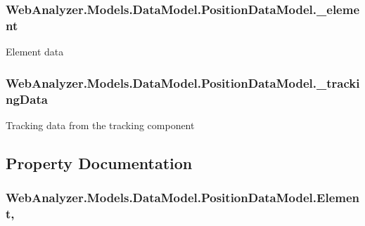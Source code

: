 \subsubsection[{\+\_\+element}]{ Web\+Analyzer.\+Models.\+Data\+Model.\+Position\+Data\+Model.\+\_\+element\hspace{0.3cm}{\ttfamily [private]}}\label{class_web_analyzer_1_1_models_1_1_data_model_1_1_position_data_model_a2f78c931c2eaded13347f182a79968e4}


Element data 

\hypertarget{class_web_analyzer_1_1_models_1_1_data_model_1_1_position_data_model_a64809478becce669e0c67a035711df49}{}
\subsubsection[{\+\_\+tracking\+Data}]{ Web\+Analyzer.\+Models.\+Data\+Model.\+Position\+Data\+Model.\+\_\+tracking\+Data\hspace{0.3cm}{\ttfamily [private]}}\label{class_web_analyzer_1_1_models_1_1_data_model_1_1_position_data_model_a64809478becce669e0c67a035711df49}


Tracking data from the tracking component 



\subsection{Property Documentation}
\hypertarget{class_web_analyzer_1_1_models_1_1_data_model_1_1_position_data_model_a4825afc0a1ecf3eeb0876be8611111ba}{}
\subsubsection[{Element}]{ Web\+Analyzer.\+Models.\+Data\+Model.\+Position\+Data\+Model.\+Element\hspace{0.3cm}{\ttfamily [get]}, {\ttfamily [set]}}\label{class_web_analyzer_1_1_models_1_1_data_model_1_1_position_data_model_a4825afc0a1ecf3eeb0876be8611111ba}


